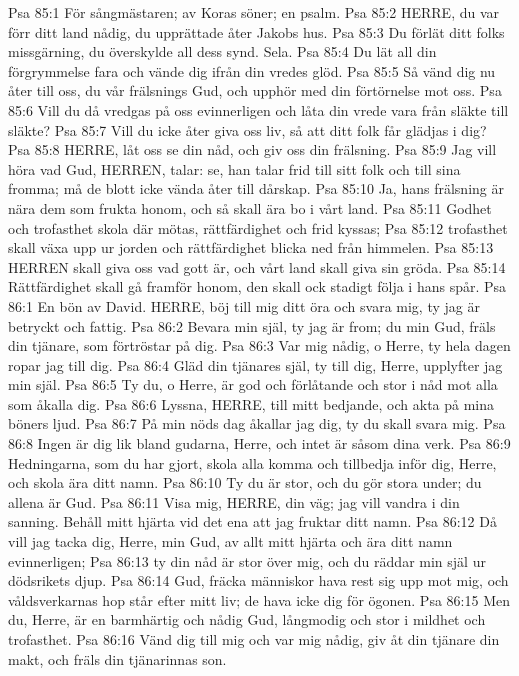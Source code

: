 Psa 85:1  För sångmästaren; av Koras söner; en psalm.
Psa 85:2  HERRE, du var förr ditt land nådig, du upprättade åter Jakobs hus.
Psa 85:3  Du förlät ditt folks missgärning, du överskylde all dess synd. Sela.
Psa 85:4  Du lät all din förgrymmelse fara och vände dig ifrån din vredes glöd.
Psa 85:5  Så vänd dig nu åter till oss, du vår frälsnings Gud, och upphör med din förtörnelse mot oss.
Psa 85:6  Vill du då vredgas på oss evinnerligen och låta din vrede vara från släkte till släkte?
Psa 85:7  Vill du icke åter giva oss liv, så att ditt folk får glädjas i dig?
Psa 85:8  HERRE, låt oss se din nåd, och giv oss din frälsning.
Psa 85:9  Jag vill höra vad Gud, HERREN, talar: se, han talar frid till sitt folk och till sina fromma; må de blott icke vända åter till dårskap.
Psa 85:10  Ja, hans frälsning är nära dem som frukta honom, och så skall ära bo i vårt land.
Psa 85:11  Godhet och trofasthet skola där mötas, rättfärdighet och frid kyssas;
Psa 85:12  trofasthet skall växa upp ur jorden och rättfärdighet blicka ned från himmelen.
Psa 85:13  HERREN skall giva oss vad gott är, och vårt land skall giva sin gröda.
Psa 85:14  Rättfärdighet skall gå framför honom, den skall ock stadigt följa i hans spår.
Psa 86:1  En bön av David. HERRE, böj till mig ditt öra och svara mig, ty jag är betryckt och fattig.
Psa 86:2  Bevara min själ, ty jag är from; du min Gud, fräls din tjänare, som förtröstar på dig.
Psa 86:3  Var mig nådig, o Herre, ty hela dagen ropar jag till dig.
Psa 86:4  Gläd din tjänares själ, ty till dig, Herre, upplyfter jag min själ.
Psa 86:5  Ty du, o Herre, är god och förlåtande och stor i nåd mot alla som åkalla dig.
Psa 86:6  Lyssna, HERRE, till mitt bedjande, och akta på mina böners ljud.
Psa 86:7  På min nöds dag åkallar jag dig, ty du skall svara mig.
Psa 86:8  Ingen är dig lik bland gudarna, Herre, och intet är såsom dina verk.
Psa 86:9  Hedningarna, som du har gjort, skola alla komma och tillbedja inför dig, Herre, och skola ära ditt namn.
Psa 86:10  Ty du är stor, och du gör stora under; du allena är Gud.
Psa 86:11  Visa mig, HERRE, din väg; jag vill vandra i din sanning. Behåll mitt hjärta vid det ena att jag fruktar ditt namn.
Psa 86:12  Då vill jag tacka dig, Herre, min Gud, av allt mitt hjärta och ära ditt namn evinnerligen;
Psa 86:13  ty din nåd är stor över mig, och du räddar min själ ur dödsrikets djup.
Psa 86:14  Gud, fräcka människor hava rest sig upp mot mig, och våldsverkarnas hop står efter mitt liv; de hava icke dig för ögonen.
Psa 86:15  Men du, Herre, är en barmhärtig och nådig Gud, långmodig och stor i mildhet och trofasthet.
Psa 86:16  Vänd dig till mig och var mig nådig, giv åt din tjänare din makt, och fräls din tjänarinnas son.
